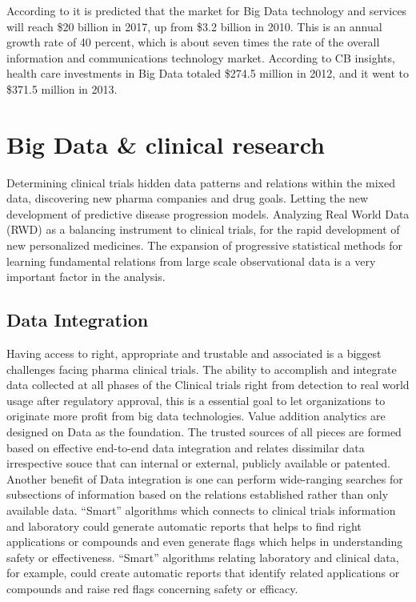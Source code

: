 \documentclass[sigconf]{acmart}
\begin{document}
According to \cite{TR03} it is predicted that the market for Big Data
technology and services will reach \$20 billion in 2017, up from 
\$3.2 billion in 2010. This is an annual growth rate of 40 percent,
which is about seven times the rate of the overall information and
communications technology market. According to CB insights, health
care investments in Big Data totaled \$274.5 million in 2012, and 
it went to \$371.5 million in 2013.

\section{Big Data \& clinical research}
Determining clinical trials hidden data patterns and relations within
the mixed data, discovering new pharma companies and drug goals.
Letting the new development of predictive disease progression models.
Analyzing Real World Data (RWD) as a balancing instrument to 
clinical trials, for the rapid development of new personalized 
medicines. The expansion of progressive statistical methods for 
learning fundamental relations from large scale observational data is a
very important factor in the analysis\cite{TR04}.

\subsection{Data Integration}
Having access to right, appropriate and trustable and associated is a 
biggest challenges facing pharma clinical trials. The
ability to accomplish and integrate data collected at all phases of the
Clinical trials right from detection to real world usage after regulatory 
approval, this is a essential goal to let organizations to originate
more profit from big data technologies. Value addition analytics are designed
on Data as the foundation.  The trusted sources of all pieces are formed 
based on effective end-to-end data integration and relates dissimilar data
irrespective souce that can internal or external, publicly available or patented.
Another benefit of Data integration is one can perform wide-ranging 
searches for subsections of information based on the relations established 
rather than only available data.  ``Smart'' algorithms which connects 
to clinical trials information and laboratory could generate automatic
reports that helps to find right applications or compounds and even 
generate flags which helps in understanding safety or effectiveness.
``Smart'' algorithms relating laboratory and clinical data, for example, 
could create automatic reports that identify related 
applications or compounds and raise red flags concerning safety or 
efficacy\cite{TR02}.
\end{document}

